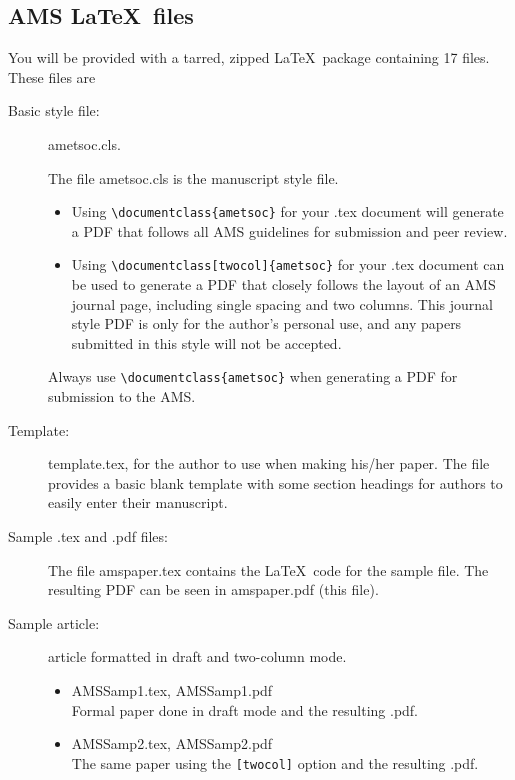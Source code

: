 \documentclass{ametsoc}
\begin{document}
\appendix[B]

\subsection{AMS \LaTeX\ files}
You will be provided with a tarred, zipped \LaTeX\ package containing 
17 files. These files are

\begin{description}
\item[Basic style file:] ametsoc.cls. 

The file ametsoc.cls is the manuscript style file.  

\begin{itemize}
\item
Using \verb+\documentclass{ametsoc}+ for your .tex document
will 
generate a PDF that follows all AMS guidelines for submission and peer
review.  

\item
Using \verb+\documentclass[twocol]{ametsoc}+ for your .tex document
can be used to generate a PDF that closely
follows the layout of an AMS journal page, including single spacing and two
columns.  This journal style PDF is only for the author's personal use, and
any papers submitted in this style will not be accepted.  
\end{itemize}
Always use \verb+\documentclass{ametsoc}+ 
when generating a PDF for submission to the AMS. 

\item[Template:]
template.tex, for the author to use when making his/her
paper.
The file provides a basic blank template with some
section headings for authors to easily enter their manuscript.

\item[Sample .tex and .pdf files:]
The file amspaper.tex contains the \LaTeX\ code for the sample file.  
The resulting PDF can be seen in amspaper.pdf (this file).


\item[Sample article:] article formatted in draft and two-column mode.

\begin{itemize}
\item
AMSSamp1.tex, AMSSamp1.pdf\\
Formal paper done in draft mode and the resulting .pdf.

\item
AMSSamp2.tex, AMSSamp2.pdf \\
The same paper using the \verb+[twocol]+ option and the resulting .pdf.


\end{itemize}
\end{description}
\end{document}
